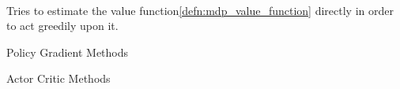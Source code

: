 \begin{propositionbox}\nospacing
  \begin{proposition}\label{proposition:model_free_rl}\leavevmode\\
    Tries to estimate the value function\cref{defn:mdp_value_function} directly in order
    to act greedily upon it.
    \begin{itemizenosep}
      \item Policy Gradient Methods
      \item Actor Critic Methods
    \end{itemizenosep}
  \end{proposition}
\end{propositionbox}

